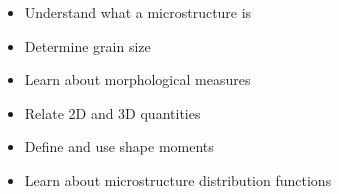 
\begin{learningobjectives}
{\begin{itemize}
    \item[{\color{OCBurntOrange}\ref{\chabbr:sec:whatisit}:}] Understand what a microstructure is
    \item[{\color{OCBurntOrange}\ref{\chabbr:sec:grainsize}:}] Determine grain size
    \item[{\color{OCBurntOrange}\ref{\chabbr:sec:morphmeasure}:}] Learn about morphological measures
    \item[{\color{OCBurntOrange}\ref{\chabbr:sec:stereology}:}] Relate 2D and 3D quantities
    \item[{\color{OCBurntOrange}\ref{\chabbr:sec:momentshapedescriptors}:}] Define and use shape moments
    \item[{\color{OCBurntOrange}\ref{\chabbr:sec:microdist}:}] Learn about microstructure distribution functions
\end{itemize}}
\end{learningobjectives}



